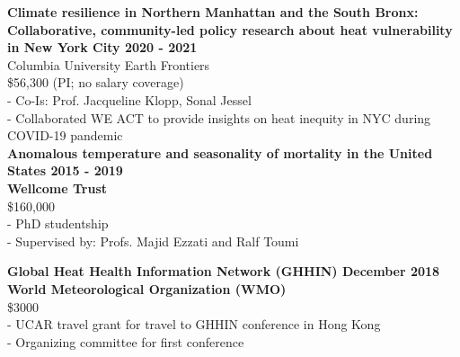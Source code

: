 \noindent \textbf{Climate resilience in Northern Manhattan and the South Bronx: Collaborative, community-led policy research about heat vulnerability in New York City \hfill 2020 - 2021 } \\
Columbia University Earth Frontiers \\ 
\$56,300 (PI; no salary coverage) \\
- Co-Is: Prof. Jacqueline Klopp, Sonal Jessel\\
- Collaborated WE ACT to provide insights on heat inequity in NYC during COVID-19 pandemic \\

\noindent \textbf{Anomalous temperature and seasonality of mortality in the United States \hfill 2015 - 2019 \\ 
Wellcome Trust} \\
\$160,000 \\
- PhD studentship\\
- Supervised by: Profs. Majid Ezzati and Ralf Toumi \bigskip

\noindent \textbf{Global Heat Health Information Network (GHHIN) \hfill December 2018\\ 
World Meteorological Organization (WMO)}\\
\$3000 \\
- UCAR travel grant for travel to GHHIN conference in Hong Kong \\
- Organizing committee for first conference \bigskip

\newpage
